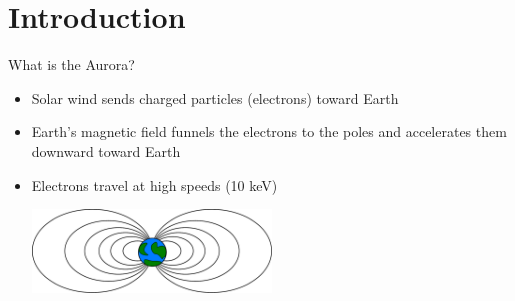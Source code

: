 \documentclass[xcolor=pdftex,dvipsnames,table,usenames,11pt]{beamer}
\begin{document}
\section{Introduction}



\begin{frame}{What is the Aurora?}
\begin{itemize}
\item Solar wind sends charged particles (electrons) toward Earth
\item Earth's magnetic field funnels the electrons to the poles and accelerates them downward toward Earth
\item Electrons travel at high speeds (10 keV)
\begin{center}
\includegraphics[width=0.5\textwidth]{img/fieldlines.pdf}
\end{center}
\end{itemize}
\end{frame}
\end{document}
